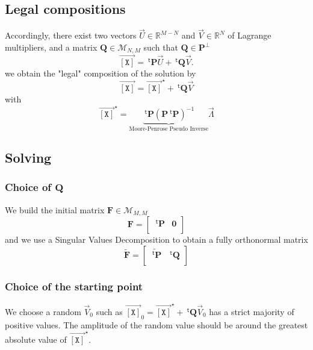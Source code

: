 \documentclass[aps,twocolumn]{revtex4}
\newcommand{\myconc}[1]{\left\lbrack #1 \right\rbrack}
\newcommand{\mychem}[1]{{\mathtt{#1}}}
\newcommand{\mymat}[1]{\boldsymbol{#1}}
\newcommand{\mytrn}[1]{{\!\!~^{\mathsf{t}}{#1}}}
\newcommand{\myvec}[1]{\overrightarrow{#1}}
\newcommand{\vecX}{\myvec{\myconc{\mychem{X}}}}
\begin{document}
\subsection{Legal compositions}
Accordingly, there exist two vectors $\vec{U}\in\mathbb{R}^{M-N}$ and $\vec{V}\in \mathbb{R}^{N}$ of Lagrange multipliers, and
a matrix  $\mymat{Q}\in\mathcal{M}_{N,M}$ such that $\mymat{Q}\in\mymat{P}^\perp$
\begin{equation}
	\vecX = \mytrn{\mymat{P}} \vec{U} + \mytrn{\mymat{Q}}\vec{V}.
\end{equation}
we obtain the "legal" composition of the solution by
\begin{equation}
	\vecX = \vecX^\star + \mytrn{\mymat{Q}}\vec{V}
\end{equation}
with 
\begin{equation}
	\vecX^\star= \underbrace{\mytrn{\mymat{P}} \left(\mymat{P} \mytrn{\mymat{P}}\right)^{-1}}_{\text{Moore-Penrose Pseudo Inverse}} \vec{\Lambda}
\end{equation}

\subsection{Solving}
\subsubsection{Choice of $\mymat{Q}$}
We build the initial matrix $\mymat{F}\in\mathcal{M}_{M,M}$
\begin{equation}
	\mymat{F} = 
	\left\lbrack
	\begin{array}{cc}
	\mytrn{\mymat{P}} & \mymat{0} \\
	\end{array}
	\right\rbrack
\end{equation}
and we use a Singular Values Decomposition to obtain a fully
orthonormal matrix
\begin{equation}
	\tilde{\mymat{F}} = 
	\left\lbrack
	\begin{array}{cc}
	\tilde{\mytrn{\mymat{P}}} & \mytrn{\mymat{Q}} \\
	\end{array}
	\right\rbrack
\end{equation}

\subsubsection{Choice of the starting point}
We choose a random $\vec{V}_0$ such as $\vecX_0 = \vecX^\star +  \mytrn{\mymat{Q}}\vec{V}_0$ has a strict majority of
positive values.
The amplitude of the random value
should be around the greatest absolute value of $\vecX^\star$.
\end{document}
